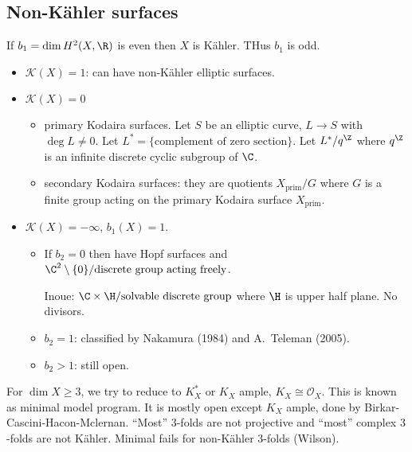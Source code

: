 \documentclass[a4paper]{article}
\begin{document}
\subsection{Non-Kähler surfaces}

If \(b_1 = \dim H^2(X, \R)\) is even then \(X\) is Kähler. THus \(b_1\) is odd.
\begin{itemize}
\item \(\mathcal K(X) = 1\): can have non-Kähler elliptic surfaces.
\item \(\mathcal K(X) = 0\)
  \begin{itemize}
  \item primary Kodaira surfaces. Let \(S\) be an elliptic curve, \(L \to S\) with \(\deg L \neq 0\). Let \(L^* = \{\text{complement of zero section}\}\). Let \(L^*/q^\Z\) where \(q^\Z\) is an infinite discrete cyclic subgroup of \(\C\).
  \item secondary Kodaira surfaces: they are quotients \(X_{\text{prim}}/G\) where \(G\) is a finite group acting on the primary Kodaira surface \(X_{\text{prim}}\).
  \end{itemize}
\item \(\mathcal K(X) = -\infty\), \(b_1(X) = 1\).
  \begin{itemize}
  \item If \(b_2 = 0\) then have Hopf surfaces and \(\C^2\setminus \{0\}/\text{discrete group acting freely}\).

    Inoue: \(\C \times \H/\text{solvable discrete group}\) where \(\H\) is upper half plane. No divisors.
  \item \(b_2 = 1\): classified by Nakamura (1984) and A.\ Teleman (2005).
  \item \(b_2 > 1\): still open.
  \end{itemize}
\end{itemize}

For \(\dim X \geq 3\), we try to reduce to \(K_X^*\) or \(K_X\) ample, \(K_X \cong \mathcal O_X\). This is known as minimal model program. It is mostly open except \(K_X\) ample, done by Birkar-Cascini-Hacon-Mclernan. ``Most'' \(3\)-folds are not projective and ``most'' complex \(3\)-folds are not Kähler. Minimal fails for non-Kähler 3-folds (Wilson).

\printindex
\end{document}
